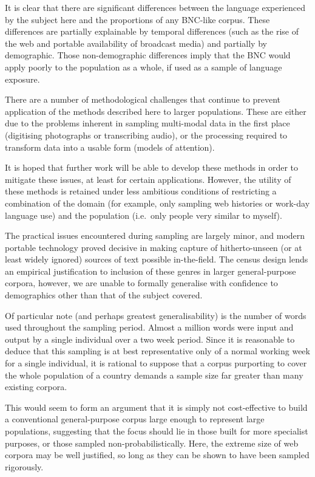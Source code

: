 

It is clear that there are significant differences between the language experienced by the subject here and the proportions of any BNC-like corpus.  These differences are partially explainable by temporal differences (such as the rise of the web and portable availability of broadcast media) and partially by demographic.  Those non-demographic differences imply that the BNC would apply poorly to the population as a whole, if used as a sample of language exposure.

There are a number of methodological challenges that continue to prevent application of the methods described here to larger populations.  These are either due to the problems inherent in sampling multi-modal data in the first place (digitising photographs or transcribing audio), or the processing required to transform data into a usable form (models of attention).

It is hoped that further work will be able to develop these methods in order to mitigate these issues, at least for certain applications.  However, the utility of these methods is retained under less ambitious conditions of restricting a combination of the domain (for example, only sampling web histories or work-day language use) and the population (i.e.\ only people very similar to myself).

The practical issues encountered during sampling are largely minor, and modern portable technology proved decisive in making capture of hitherto-unseen (or at least widely ignored) sources of text possible in-the-field.  The census design lends an empirical justification to inclusion of these genres in larger general-purpose corpora, however, we are unable to formally generalise with confidence to demographics other than that of the subject covered.

Of particular note (and perhaps greatest generalisability) is the number of words used throughout the sampling period.  Almost a million words were input and output by a single individual over a two week period.  Since it is reasonable to deduce that this sampling is at best representative only of a normal working week for a single individual, it is rational to suppose that a corpus purporting to cover the whole population of a country demands a sample size far greater than many existing corpora.


This would seem to form an argument that it is simply not cost-effective to build a conventional general-purpose corpus large enough to represent large populations, suggesting that the focus should lie in those built for more specialist purposes, or those sampled non-probabilistically.  Here, the extreme size of web corpora may be well justified, so long as they can be shown to have been sampled rigorously.


